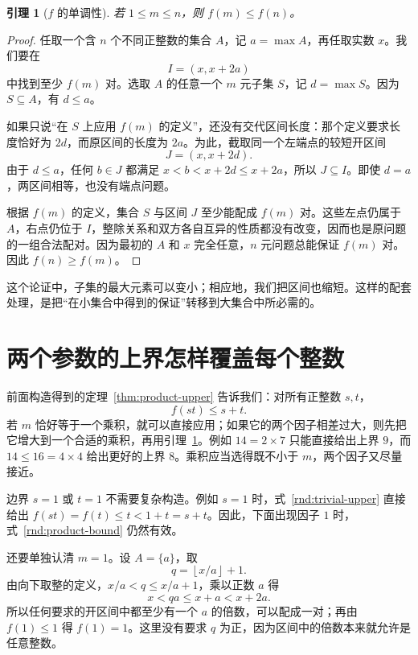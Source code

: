 \documentclass[UTF8,a4paper,oneside,openany,fontset=fandol,zihao=-4]{ctexbook}
\theoremstyle{guide}
\newtheorem{lemma}[theorem]{引理}
\newcommand{\floor}[1]{\left\lfloor#1\right\rfloor}
\begin{document}
\begin{lemma}[$f$ 的单调性]\label{rnd:monotonicity}
若 $1\leq m\leq n$，则 $f(m)\leq f(n)$。
\end{lemma}

\begin{proof}
任取一个含 $n$ 个不同正整数的集合 $A$，记 $a=\max A$，再任取实数 $x$。我们要在
\[
I=(x,x+2a)
\]
中找到至少 $f(m)$ 对。选取 $A$ 的任意一个 $m$ 元子集 $S$，记 $d=\max S$。因为 $S\subseteq A$，有 $d\leq a$。

如果只说“在 $S$ 上应用 $f(m)$ 的定义”，还没有交代区间长度：那个定义要求长度恰好为 $2d$，而原区间的长度为 $2a$。为此，截取同一个左端点的较短开区间
\[
J=(x,x+2d).
\]
由于 $d\leq a$，任何 $b\in J$ 都满足 $x<b<x+2d\leq x+2a$，所以 $J\subseteq I$。即使 $d=a$，两区间相等，也没有端点问题。

根据 $f(m)$ 的定义，集合 $S$ 与区间 $J$ 至少能配成 $f(m)$ 对。这些左点仍属于 $A$，右点仍位于 $I$，整除关系和双方各自互异的性质都没有改变，因而也是原问题的一组合法配对。因为最初的 $A$ 和 $x$ 完全任意，$n$ 元问题总能保证 $f(m)$ 对。因此 $f(n)\geq f(m)$。
\end{proof}

这个论证中，子集的最大元素可以变小；相应地，我们把区间也缩短。这样的配套处理，是把“在小集合中得到的保证”转移到大集合中所必需的。

\section{两个参数的上界怎样覆盖每个整数}

前面构造得到的定理~\ref{thm:product-upper} 告诉我们：对所有正整数 $s,t$，
\begin{equation}\label{rnd:product-bound}
f(st)\leq s+t.
\end{equation}
若 $m$ 恰好等于一个乘积，就可以直接应用；如果它的两个因子相差过大，则先把它增大到一个合适的乘积，再用引理~\ref{rnd:monotonicity}。例如 $14=2\times7$ 只能直接给出上界 $9$，而 $14\le16=4\times4$ 给出更好的上界 $8$。乘积应当选得既不小于 $m$，两个因子又尽量接近。

边界 $s=1$ 或 $t=1$ 不需要复杂构造。例如 $s=1$ 时，式~\eqref{rnd:trivial-upper} 直接给出 $f(st)=f(t)\leq t<1+t=s+t$。因此，下面出现因子 $1$ 时，式~\eqref{rnd:product-bound} 仍然有效。

还要单独认清 $m=1$。设 $A=\{a\}$，取
\[
q=\floor{x/a}+1.
\]
由向下取整的定义，$x/a<q\leq x/a+1$，乘以正数 $a$ 得
\[
x<qa\leq x+a<x+2a.
\]
所以任何要求的开区间中都至少有一个 $a$ 的倍数，可以配成一对；再由 $f(1)\leq1$ 得 $f(1)=1$。这里没有要求 $q$ 为正，因为区间中的倍数本来就允许是任意整数。
\end{document}

